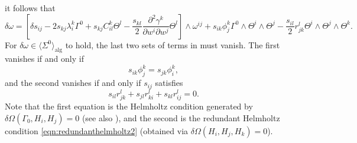 \documentclass[11pt]{article}
\theoremstyle{plain}
\theoremstyle{definition}
\begin{document}
it follows that
\begin{equation}\label{eqn:deltaomega}
    \delta \omega=\left[\delta s_{ij}-2s_{kj}\lambda_i^k \Gamma^0+s_{kj}C_{il}^k \Theta^l-\frac{s_{kl}}{2}\frac{\partial^2 \gamma^k}{\partial w^i \partial w^j}\Theta^l\right]\wedge \omega^{ij}+s_{ik}\phi_j^k \Gamma^0\wedge \Theta^i\wedge \Theta^j-\frac{s_{il}}{2}r_{jk}^l \Theta^i\wedge \Theta^j\wedge \Theta^k.
\end{equation}
For $\delta \omega\in \langle \Sigma^0\rangle_{\mathrm{alg}}$ to hold, the last two sets of terms in  must vanish. The first vanishes if and only if
\begin{equation}\label{eqn:phicondition}
    s_{ik}\phi_j^k=s_{jk}\phi_i^k,
\end{equation}
and the second vanishes if and only if $s_{ij}$ satisfies
\begin{equation}\label{eqn:curvaturecondition}
    s_{il}r_{jk}^l+s_{jl}r_{ki}^l+s_{kl}r_{ij}^l=0.
\end{equation}
Note that the first equation is the Helmholtz condition generated by $\delta \Omega(\Gamma_0,H_i,H_j)=0$ (see also ), and the second is the redundant Helmholtz condition \eqref{eqn:redundanthelmholtz2} (obtained via $\delta \Omega(H_i,H_j,H_k)=0$).
\end{document}
